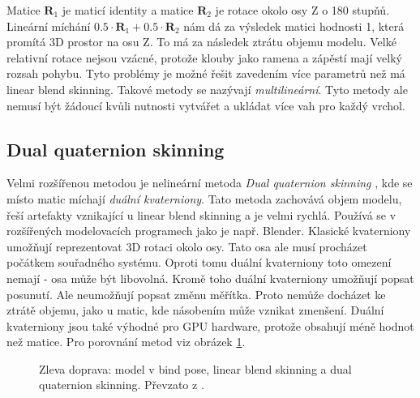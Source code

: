Matice $\mathbf{R}_1$ je maticí identity a matice $\mathbf{R}_2$ je rotace okolo osy Z o 180 stupňů. Lineární míchání $0.5 \cdot \mathbf{R}_1 + 0.5 \cdot \mathbf{R}_2$ nám dá za výsledek matici hodnosti 1, která promítá 3D prostor na osu Z. To má za následek ztrátu objemu modelu. Velké relativní rotace nejsou vzácné, protože klouby jako ramena a zápěstí mají velký rozsah pohybu. Tyto problémy je možné řešit zavedením více parametrů než má linear blend skinning. Takové metody se nazývají \textit{multilineární}. Tyto metody ale nemusí být žádoucí kvůli nutnosti vytvářet a ukládat více vah pro každý vrchol.

\subsection{Dual quaternion skinning}
Velmi rozšířenou metodou je nelineární metoda \textit{Dual quaternion skinning} \cite{dualQuat}, kde se místo matic míchají \textit{duální kvaterniony}. Tato metoda zachovává objem modelu, řeší artefakty vznikající u linear blend skinning a je velmi rychlá. Používá se v rozšířených modelovacích programech jako je např. Blender. Klasické kvaterniony umožňují reprezentovat 3D rotaci okolo osy. Tato osa ale musí procházet počátkem souřadného systému. Oproti tomu duální kvaterniony toto omezení nemají - osa může být libovolná. Kromě toho duální kvaterniony umožňují popsat posunutí. Ale neumožňují popsat změnu měřítka. Proto nemůže docházet ke ztrátě objemu, jako u matic, kde násobením může vznikat zmenšení. Duální kvater\-niony jsou také výhodné pro GPU hardware, protože obsahují méně hodnot než matice. Pro porovnání metod viz obrázek \ref{skinning_methods}.

\begin{figure}[h]
\begin{center}
\caption{Zleva doprava: model v bind pose, linear blend skinning a dual quaternion skinning. Převzato z \cite{skinningMethods}.} \label{skinning_methods}
\end{center}
\end{figure}

